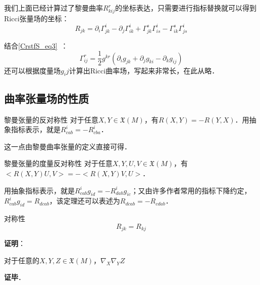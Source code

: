 我们上面已经计算过了黎曼曲率$R^r_{kij}$的坐标表达，只需要进行指标替换就可以得到Ricci张量场的坐标：
\begin{equation}
R_{jk}=\partial_i\Gamma^i_{jk}-\partial_j\Gamma^{i}_{ik}+\Gamma^s_{jk}\Gamma^i_{is}-\Gamma^s_{ik}\Gamma^i_{js}
\end{equation}

结合\autoref{CrstfS_eq3}~：
\begin{equation}
\Gamma^{r}_{ij}=\frac{1}{2}g^{kr}(\partial_ig_{jk}+\partial_jg_{ki}-\partial_kg_{ij})
\end{equation}
还可以根据度量场$g_ij$计算出Ricci曲率场，写起来非常长，在此从略．














\subsection{曲率张量场的性质}

\begin{theorem}{黎曼张量的反对称性}
对于任意$X, Y\in\mathfrak{X}(M)$，有$R(X, Y)=-R(Y, X)$．用抽象指标表示，就是$R^i_{cab}=-R^i_{cba}$．
\end{theorem}


这一点由黎曼曲率张量的定义直接可得．





\begin{theorem}{黎曼张量的度量反对称性}
对于任意$X, Y, U, V\in\mathfrak{X}(M)$，有$<R(X, Y)U, V>=-<R(X, Y)V, U>$．

用抽象指标表示，就是$R^i_{cab}g_{id}=-R^i_{dab}g_{ic}$；又由许多作者常用的指标下降约定，$R^i_{cab}g_{id}=R_{dcab}$，该定理还可以表述为$R_{dcab}=-R_{cdab}$．
\end{theorem}



\begin{theorem}{对称性}
\begin{equation}
R_{jk}=R_{kj}
\end{equation}
\end{theorem}

\textbf{证明}：

对于任意的$X, Y, Z\in\mathfrak{X}(M)$，$\nabla_{X}\nabla_{Y}Z$

\textbf{证毕}．


















